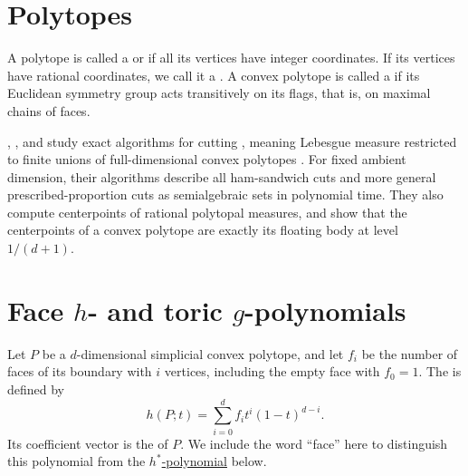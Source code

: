 


\section[polytope]{Polytopes}


A polytope is called a \label{latticePolytope}
or \label{integralPolytope}
if all its vertices have integer coordinates.
If its vertices have rational coordinates, we call it a
\label{rationalPolytope}.
A convex polytope is called a \label{regularPolytope}
if its Euclidean symmetry group acts transitively on its flags, that is, on
maximal chains of faces.

, , and
 study exact algorithms for cutting \label{polytopalMeasure}, meaning Lebesgue measure restricted to
finite unions of full-dimensional convex polytopes
\cite{BrandenburgLoeraMeroni2026x}.  For fixed ambient dimension, their
algorithms describe all ham-sandwich cuts and more general
prescribed-proportion cuts as semialgebraic sets in polynomial time.  They also
compute centerpoints of rational polytopal measures, and show that the
centerpoints of a convex polytope are exactly its floating body at level
$1/(d+1)$.


\section[polytopeFacePolynomials]{Face $h$- and toric $g$-polynomials}

Let $P$ be a $d$-dimensional simplicial convex polytope, and let $f_i$ be the
number of faces of its boundary with $i$ vertices, including the empty face
with $f_0=1$.  The \label{polytopeFaceHPolynomial}
is defined by
\[
  h(P;t)=\sum_{i=0}^{d} f_i t^i(1-t)^{d-i}.
\]
Its coefficient vector is the  of $P$.  We include the
word ``face'' here to distinguish this polynomial from the
\hyperref[hStarPolynomial]{$h^*$-polynomial} below.


